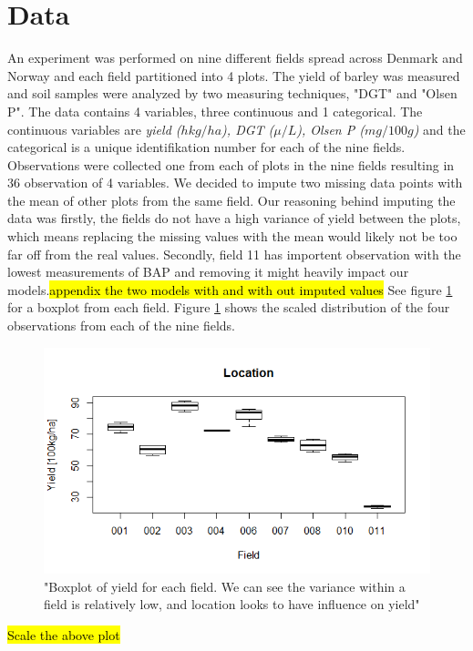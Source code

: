 \documentclass{article}
\begin{document}
\section{Data}
An experiment was performed on nine different fields spread across Denmark and Norway and each field partitioned into 4 plots. The yield of barley was measured and soil samples were analyzed by two measuring techniques, "DGT" and "Olsen P".
The data contains 4 variables, three continuous and 1 categorical. The continuous variables are \textit{yield ($hkg/ha$), DGT ($\mu/L$), Olsen P ($mg/100g$)} and the categorical is a unique identifikation number for each of the nine fields.
Observations were collected one from each of plots in the nine fields resulting in 36 observation of 4 variables.
We decided to impute two missing data points with the mean of other plots from the same field.
Our reasoning behind imputing the data was firstly, the fields do not have a high variance of yield between the plots, which means replacing the missing values with the mean would likely not be too far off from the real values.
Secondly, field 11 has importent observation with the lowest measurements of BAP and removing it might heavily impact our models.\hl{appendix the two models with and with out imputed values} See figure \ref{fig:loc} for a boxplot from each field. Figure \ref{fig:loc} shows the scaled distribution of the four observations from each of the nine fields.
 
\begin{figure}[H]
\includegraphics[width=\linewidth]{locationYield.png}
\caption{"Boxplot of yield for each field. We can see the variance within a field is relatively low, and location looks to have influence on yield"}
\label{fig:loc}
\end{figure}
\hl{Scale the above plot}
\end{document}

